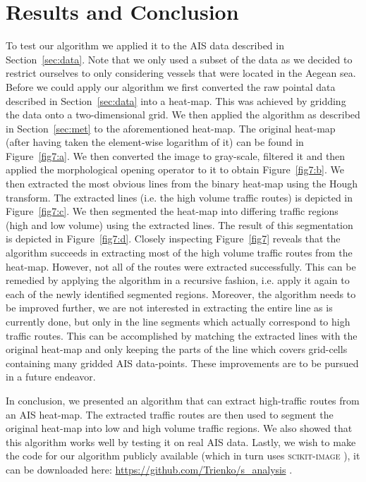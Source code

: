 \documentclass{article}
\begin{document}
\section{Results and Conclusion}
To test our algorithm we applied it to the AIS data described in Section~\ref{sec:data}. Note that we only used a subset of the data as we decided to restrict ourselves to only considering vessels that were located in the Aegean sea. Before we could apply our algorithm we first converted the raw pointal data described in Section~\ref{sec:data} into a heat-map.
This was achieved by gridding the data onto a two-dimensional grid. We then applied the algorithm as described in Section~\ref{sec:met} to the aforementioned heat-map. 
The original heat-map (after having taken the element-wise logarithm of it) can be found in Figure~\ref{fig7:a}. We then converted the image to gray-scale, filtered it and 
then applied the morphological opening operator to it to obtain Figure~\ref{fig7:b}. We then extracted the most obvious lines from the binary heat-map using the Hough transform. The 
extracted lines (i.e. the high volume traffic routes) is depicted in Figure~\ref{fig7:c}. We then segmented the heat-map into differing traffic regions (high and low volume) using the 
extracted lines. The result of this segmentation is depicted in Figure~\ref{fig7:d}. Closely inspecting Figure~\ref{fig7} reveals that the algorithm succeeds in extracting most of the high volume traffic routes from the heat-map.
However, not all of the routes were extracted successfully. This can be remedied by applying the algorithm in a recursive fashion, i.e. apply it again to each of the newly identified segmented regions. Moreover, 
the algorithm needs to be improved further, we are not interested in extracting the entire line as is currently done, but only in the line segments which actually correspond to high 
traffic routes. This can be accomplished by matching the extracted lines with the original heat-map and only keeping the parts of the line 
which covers grid-cells containing many gridded AIS data-points. These improvements are to be pursued in a future endeavor.

In conclusion, we presented an algorithm that can extract high-traffic routes from an AIS heat-map. The extracted traffic routes are then used to segment the original 
heat-map into low and high volume traffic regions. We also showed that this algorithm works well by testing it on real 
AIS data. Lastly, we wish to make the code for our algorithm publicly available (which in turn uses \textsc{scikit-image} \cite{scikitimage}), it can be downloaded here: \url{https://github.com/Trienko/s_analysis} .
\end{document}
